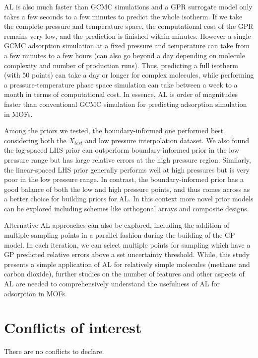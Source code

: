 \documentclass[twoside,twocolumn,9pt]{article}
\begin{document}
AL is also much faster than GCMC simulations and a GPR surrogate model only takes a few seconds to a few minutes to predict the whole isotherm. If we take the complete pressure and temperature space, the computational cost of the GPR remains very low, and the prediction is finished within minutes. However a single GCMC adsorption simulation at a fixed pressure and temperature can take from a few minutes to a few hours (can also go beyond a day depending on molecule complexity and number of production runs). Thus, predicting a full isotherm (with 50 points) can take a day or longer for complex molecules, while performing a pressure-temperature phase space simulation can take between a week to a month in terms of computational cost. In essence, AL is order of magnitudes faster than conventional GCMC simulation for predicting adsorption simulation in MOFs.

Among the priors we tested, the boundary-informed one performed best considering both the $X_{test}$ and low pressure interpolation dataset. We also found the log-spaced LHS prior can outperform boundary-informed prior in the low pressure range but has large relative errors at the high pressure region. Similarly, the linear-spaced LHS prior generally performs well at high pressures but is very poor in the low pressure range. In contrast, the boundary-informed prior has a good balance of both the low and high pressure points, and thus comes across as a better choice for building priors for AL. In this context more novel prior models can be explored including schemes like orthogonal arrays and composite designs.\cite{novel_priors}

Alternative AL approaches can also be explored, including the addition of multiple sampling points in a parallel fashion during the building of the GP model. In each iteration, we can select multiple points for sampling which have a GP predicted relative errors above a set uncertainty threshold. While, this study presents a simple application of AL for relatively simple molecules (methane and carbon dioxide), further studies on the number of features and other aspects of AL are needed to comprehensively understand the usefulness of AL for adsorption in MOFs.
\section*{Conflicts of interest}
There are no conflicts to declare.
\end{document}
